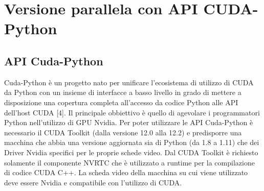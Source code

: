\documentclass[12pt,a4paper]{report}
\begin{document}
\chapter{Versione parallela con API CUDA-Python} 

\section{API Cuda-Python}
Cuda-Python è un progetto nato per unificare l'ecosistema di utilizzo di CUDA da Python con un insieme di interfacce a basso livello in grado di mettere a disposizione una copertura completa all'accesso da codice Python alle API dell'host CUDA [4]. Il principale obbiettivo è quello di agevolare i programmatori Python nell'utilizzo di GPU Nvidia. \newline \newline
Per poter utilizzare le API Cuda-Python è necessario il CUDA Toolkit (dalla versione 12.0 alla 12.2) e predisporre una macchina che abbia una versione aggiornata sia di Python (da 1.8 a 1.11) che dei Driver Nvidia specifici per le proprie schede video. \newline
Dal CUDA Toolkit è richiesto solamente il componente NVRTC che è utilizzato a runtime per la compilazione di codice CUDA C++. \newline
La scheda video della macchina su cui viene utilizzato deve essere Nvidia e compatibile con l'utilizzo di CUDA.
\end{document}
